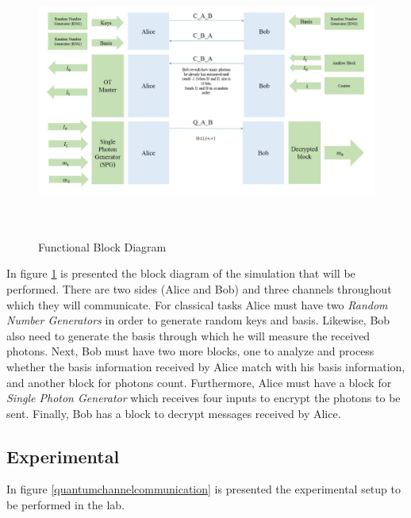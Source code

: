 \begin{figure}[h]
	\centering \includegraphics[width=1.1\textwidth,height=9cm]{./sdf/ot_with_discrete_variables/figures/DiagramBlock_Simulation.jpg}
	\caption{Functional Block Diagram}\label{functionalblockdiagram}
\end{figure}

In figure \ref{functionalblockdiagram} is presented the block diagram of the simulation that will be performed. There are two sides (Alice and Bob) and three channels throughout which they will communicate. For classical tasks Alice must have two \textit{Random Number Generators} in order to generate random keys and basis. Likewise, Bob also need to generate the basis through which he will measure the received photons. Next, Bob must have two more blocks, one to analyze and process whether the basis information received by Alice match with his basis information, and another block for photons count. Furthermore, Alice must have a block for \textit{Single Photon Generator} which receives four inputs to encrypt the photons to be sent. Finally, Bob has a block to decrypt messages received by Alice.

\subsection{Experimental}
In figure \ref{quantumchannelcommunication} is presented the experimental setup to be performed in the lab.

